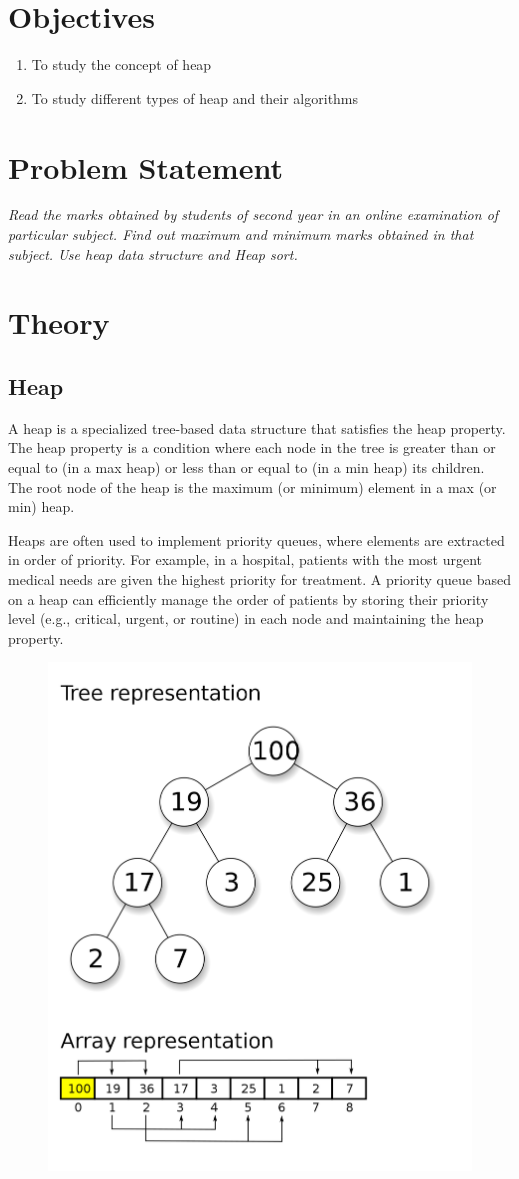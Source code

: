 \documentclass[11pt]{article}
\begin{document}
\tableofcontents
\thispagestyle{empty}
\clearpage

\setcounter{page}{1}

\section{Objectives}
\begin{enumerate}
    \item To study the concept of heap
    \item To study different types of heap and their algorithms
\end{enumerate}

\section{Problem Statement}
\textit{Read the marks obtained by students of second year in an online examination of
    particular subject. Find out maximum and minimum marks obtained in that subject. Use
    heap data structure and Heap sort.}
\section{Theory}

\subsection{Heap}

A heap is a specialized tree-based data structure that satisfies the heap property. The heap property is a condition where each node in the tree is greater than or equal to (in a max heap) or less than or equal to (in a min heap) its children. The root node of the heap is the maximum (or minimum) element in a max (or min) heap.

Heaps are often used to implement priority queues, where elements are extracted in order of priority. For example, in a hospital, patients with the most urgent medical needs are given the highest priority for treatment. A priority queue based on a heap can efficiently manage the order of patients by storing their priority level (e.g., critical, urgent, or routine) in each node and maintaining the heap property.

\begin{figure}[H]
    \centering
    \includegraphics[width=.45\textwidth]{1200px-Max-Heap-new.svg.png}
    \caption{}
\end{figure}
\end{document}
